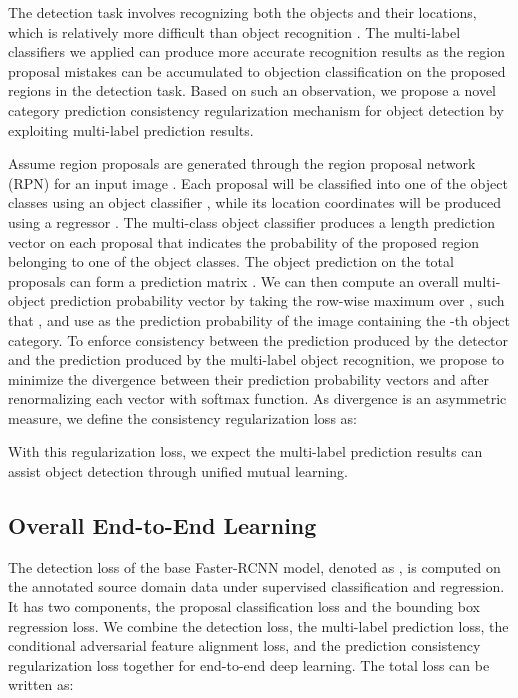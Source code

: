 \documentclass[runningheads]{llncs}
\begin{document}
The detection task involves recognizing both the objects and their locations,
which is relatively more difficult than object recognition
\cite{everingham2010pascal}.
The multi-label classifiers we applied can produce more accurate recognition results
as the region proposal mistakes can be accumulated to objection classification 
on the proposed regions in the detection task.
Based on such an observation, we propose a 
novel category prediction consistency regularization
mechanism for object detection by exploiting multi-label prediction results.


Assume  region proposals are generated through the region proposal network (RPN) for an input image .
Each proposal will be classified into one of the  object classes using an object classifier ,
while its location coordinates will be produced using a regressor . 
The multi-class object classifier produces a length  prediction vector  
on each proposal
that indicates the probability of the proposed region belonging to one of the  object classes.
The object prediction on the total  proposals can form a prediction matrix .
We can then compute an overall multi-object prediction probability vector  by taking the row-wise maximum over ,
such that , and use 
 as the prediction probability of the image  containing the -th object category.
To enforce consistency between the prediction produced by the detector and the prediction
produced by the multi-label object recognition,
we propose to minimize the  divergence between their prediction probability vectors  and 
after renormalizing each vector with softmax function.
As  divergence is an asymmetric measure, 
we define the consistency regularization loss as:

With this regularization loss, we expect the multi-label prediction results
can assist object detection through unified mutual learning.


\subsection{Overall End-to-End Learning}

The detection loss of the base Faster-RCNN model, denoted as ,
is computed on the annotated source domain data under supervised classification and regression.
It has two components, the proposal classification loss and the bounding box regression loss. 
We combine the detection loss, the multi-label prediction loss, 
the conditional adversarial feature alignment loss, and the prediction consistency regularization loss 
together for end-to-end deep learning. The total loss can be written as:
\end{document}
